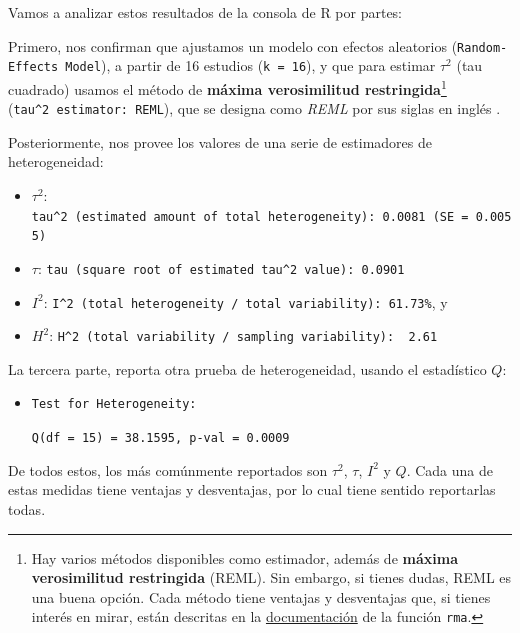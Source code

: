 \documentclass[
  bookmarksnumbered]{article}
\begin{document}
Vamos a analizar estos resultados de la consola de R por partes:

Primero, nos confirman que ajustamos un modelo con efectos aleatorios (\texttt{Random-Effects\ Model}), a partir de 16 estudios (\texttt{k\ =\ 16}), y que para estimar \(\tau^2\) (tau cuadrado) usamos el método de \textbf{máxima verosimilitud restringida}\footnote{Hay varios métodos disponibles como estimador, además de \textbf{máxima verosimilitud restringida} (REML). Sin embargo, si tienes dudas, REML es una buena opción. Cada método tiene ventajas y desventajas que, si tienes interés en mirar, están descritas en la \href{https://www.rdocumentation.org/packages/metafor/versions/2.4-0/topics/rma.uni}{documentación} de la función \texttt{rma}.} (\texttt{tau\^{}2\ estimator:\ REML}), que se designa como \emph{REML} por sus siglas en inglés .

Posteriormente, nos provee los valores de una serie de estimadores de heterogeneidad:

\begin{itemize}
\item
  \(\tau^2\): \texttt{tau\^{}2\ (estimated\ amount\ of\ total\ heterogeneity):\ 0.0081\ (SE\ =\ 0.0055)}
\item
  \(\tau\): \texttt{tau\ (square\ root\ of\ estimated\ tau\^{}2\ value):\ 0.0901}
\item
  \(I^2\): \texttt{I\^{}2\ (total\ heterogeneity\ /\ total\ variability):\ 61.73\%}, y
\item
  \(H^2\): \texttt{H\^{}2\ (total\ variability\ /\ sampling\ variability):\ \ 2.61}
\end{itemize}

La tercera parte, reporta otra prueba de heterogeneidad, usando el estadístico \(Q\):

\begin{itemize}
\item
  \texttt{Test\ for\ Heterogeneity:}

  \texttt{Q(df\ =\ 15)\ =\ 38.1595,\ p-val\ =\ 0.0009}
\end{itemize}

De todos estos, los más comúnmente reportados son \(\tau^2\), \(\tau\), \(I^2\) y \(Q\). Cada una de estas medidas tiene ventajas y desventajas, por lo cual tiene sentido reportarlas todas.
\end{document}
